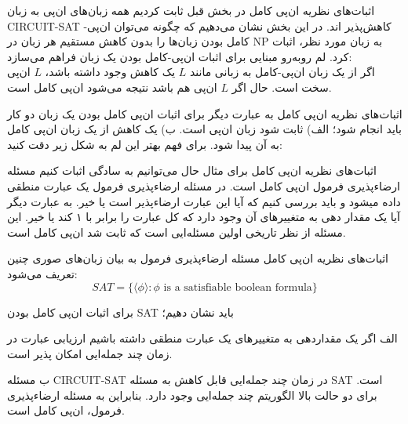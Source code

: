 \begin{itemframe}{اثبات‌های نظریه ان‌پی کامل}
\itm
در بخش قبل ثابت کردیم همه زبان‌های ان‌پی به زبان CIRCUIT-SAT کاهش‌پذیر اند.
\itm
در این بخش نشان می‌دهیم که چگونه می‌توان ان‌پی-کامل بودن زبان‌ها را بدون کاهش مستقیم هر زبان در NP به زبان مورد نظر، اثبات کرد.
\itm
لم روبه‌رو مبنایی برای اثبات ان‌پی-کامل بودن یک زبان فراهم می‌سازد:\\
اگر از یک زبان ان‌پی-کامل به زبانی مانند $L$ یک کاهش وجود داشته باشد، $L$ ان‌پی سخت است. حال اگر $L$ ان‌پی هم باشد نتیجه می‌شود ان‌پی کامل است.
\end{itemframe}

\begin{itemframe}{اثبات‌های نظریه ان‌پی کامل}
\itm
به عبارت دیگر برای اثبات ان‌پی کامل بودن یک زبان دو کار باید انجام شود؛‌ الف) ثابت شود زبان ان‌پی است. ب) یک کاهش از یک زبان ان‌پی کامل به آن پیدا شود.
\itm
برای فهم بهتر این لم به شکل زیر دقت کنید:
\end{itemframe}

\begin{itemframe}{اثبات‌های نظریه ان‌پی کامل}
\itm
برای مثال حال می‌توانیم به سادگی اثبات کنیم مسئله ارضاء‌پذیری فرمول
ان‌پی کامل است.
\itm
در مسئله ارضاءپذیری فرمول یک عبارت منطقی داده میشود و‌ باید بررسی کنیم که آیا این عبارت ارضاءپذیر است یا خیر. به عبارت دیگر آیا یک مقدار دهی به متغییرهای آن وجود دارد که کل عبارت را برابر با ۱ کند یا خیر.
\itm
این مسئله از نظر تاریخی اولین مسئله‌ایی است که ثابت شد ان‌پی کامل است.
\end{itemframe}

\begin{itemframe}{اثبات‌های نظریه ان‌پی کامل}
\itm
مسئله ارضاءپذیری فرمول به بیان زبان‌های صوری چنین تعریف می‌شود:
$$
SAT = \{\langle  \phi \rangle: \phi \text{ is a satisfiable boolean formula}\}
$$

\itm
برای اثبات ان‌پی کامل بودن SAT باید نشان دهیم؛
\item[الف]
اگر یک مقداردهی به متغییر‌های یک عبارت منطقی داشته باشیم ارزیابی عبارت در زمان چند جمله‌ایی امکان پذیر است.
\item[ب]
مسئله CIRCUIT-SAT در زمان چند جمله‌ایی قابل کاهش به مسئله SAT است.
\itm
برای دو حالت بالا الگوریتم چند جمله‌ایی وجود دارد. بنابراین به مسئله ارضاءپذیری فرمول، ان‌پی کامل است.
\end{itemframe}

